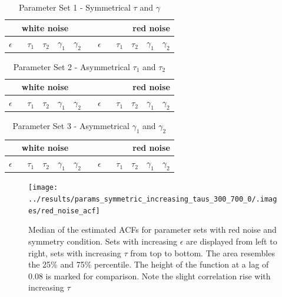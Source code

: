 \documentclass[a4paper,12pt,oneside]{book}
\theoremstyle{break}
\begin{document}
\begin{table}[!h]
	\centering
	\begin{footnotesize}
	\begin{tabular}{|c|c|c|c|c|c|r|r|r|r|r|}
		 \multicolumn{5}{|c|}{white noise} & & \multicolumn{5}{r|}{red noise} \\
		\hline
		 $\epsilon$ \  & $\tau_1$ & $\tau_2$  & $\gamma_1$ & $\gamma_2$ &  &$\epsilon$ \  & $\tau_1$ & $\tau_2$  & $\gamma_1$ & $\gamma_2$  \\
		\hline
		
	\end{tabular}
\end{footnotesize}
	\caption{Parameter Set 1 - Symmetrical $\tau$ and $\gamma$}
	\label{t/a/parameterSet1}
\end{table}	
	

\begin{table}[!h]
	\centering
	\begin{footnotesize}
		\begin{tabular}{|c|c|c|c|c|c|r|r|r|r|r|}
			\multicolumn{5}{|c|}{white noise} & & \multicolumn{5}{r|}{red noise} \\
			\hline
			$\epsilon$ \  & $\tau_1$ & $\tau_2$  & $\gamma_1$ & $\gamma_2$ &  &$\epsilon$ \  & $\tau_1$ & $\tau_2$  & $\gamma_1$ & $\gamma_2$  \\
			\hline
			
		\end{tabular}
	\end{footnotesize}
	\caption{Parameter Set 2 - Asymmetrical $\tau_1$ and $\tau_2$}
	\label{t/a/parameterSet2}
\end{table}	

\begin{table}[!h]
	\centering
	\begin{footnotesize}
		\begin{tabular}{|c|c|c|c|c|c|r|r|r|r|r|}
			\multicolumn{5}{|c|}{white noise} & & \multicolumn{5}{r|}{red noise} \\
			\hline
			$\epsilon$ \  & $\tau_1$ & $\tau_2$  & $\gamma_1$ & $\gamma_2$ &  &$\epsilon$ \  & $\tau_1$ & $\tau_2$  & $\gamma_1$ & $\gamma_2$  \\
			\hline
			
		\end{tabular}
	\end{footnotesize}
	\caption{Parameter Set 3 - Asymmetrical $\gamma_1$ and $\gamma_2$}
	\label{t/a/parameterSet3}
\end{table}	

\begin{figure}[htp]
	\texttt{[image: ../results/params\_symmetric\_increasing\_taus\_300\_700\_0/.images/red\_noise\_acf]}%
	\caption{Median of the estimated ACFs for parameter sets with red noise and symmetry condition. Sets with increasing $\epsilon$ are displayed from left to right, sets with increasing $\tau$ from top to bottom. The area resembles the 25\% and 75\% percentile. The height of the function at a lag of 0.08 is marked for comparison. Note the slight correlation rise with increasing $\tau$ }%
	\label{f/a/acf_red_sym}%
\end{figure}
\end{document}
